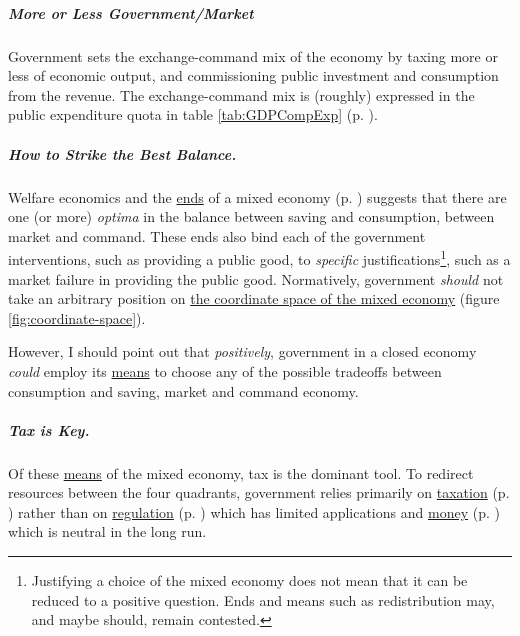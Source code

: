 
\subparagraph[Exchange-Command Mix]{More or Less Government/Market} Government sets the exchange-command mix of the economy by taxing more or less of economic output, and commissioning public investment and consumption from the revenue. The exchange-command mix is (roughly) expressed in the public expenditure quota in table \ref{tab:GDPCompExp} (p. \pageref{tab:GDPCompExp}).

\subparagraph[Optima]{How to Strike the Best Balance.} Welfare economics and the \hyperref[sec:ends]{ends} of a mixed economy (p. \pageref{sec:ends}) suggests that there are one (or more) \emph{optima} in the balance between saving and consumption, between market and command. These ends also bind each of the government interventions, such as providing a public good, to \emph{specific} justifications\footnote{
	Justifying a choice of the mixed economy does not mean that it can be reduced to a positive question. Ends and means such as redistribution may, and maybe should, remain contested.}, 
such as a market failure in providing the public good. Normatively, government \emph{should} not take an arbitrary position on \hyperref[fig:coordinate-space]{the coordinate space of the mixed economy} (figure \ref{fig:coordinate-space}). 

However, I should point out that \emph{positively}, government in a closed economy \emph{could} employ its \hyperref[sec:means]{means} to choose any of the possible tradeoffs between consumption and saving, market and command economy. 

\subparagraph[Tax is Key]{Tax is Key.} Of these \hyperref[sec:means]{means} of the mixed economy, tax is the dominant tool. To redirect resources between the four quadrants, government relies primarily on \hyperref[sec:fiscal]{taxation} (p. \pageref{sec:fiscal}) rather than on \hyperref[sec:regulatory]{regulation} (p. \pageref{sec:regulatory}) which has limited applications and \hyperref[sec:monetary]{money} (p. \pageref{sec:monetary}) which is neutral in the long run.

